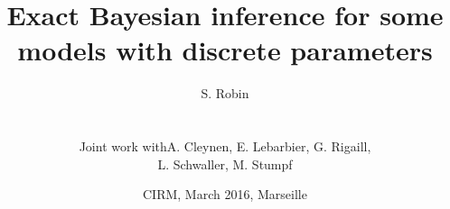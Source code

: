 \documentclass[10pt]{beamer}
\newcommand{\fignet}{/home/robin/Bureau/RECHERCHE/RESEAUX/EXPOSES/FIGURES}
\begin{document}

\title[Exact inference with discrete parameters]{Exact Bayesian inference for some models with discrete parameters}

\author[S. Robin]{S. Robin \\ ~\\
  \begin{tabular}{ll}
    Joint work with & A. Cleynen, E. Lebarbier, G. Rigaill, \\
    & L. Schwaller, M. Stumpf
  \end{tabular}
  }


\date{CIRM, March 2016, Marseille}

\maketitle

\end{document}
